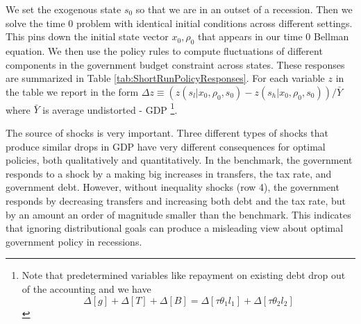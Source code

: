 \documentclass[thmsb,11pt]{article}
\begin{document}
We set the exogenous state
$s_0$ so  that we are in an outset of a recession.  Then we  solve the time 0 problem with identical initial conditions across
different settings. This pins down the initial state vector  $x_0,\rho_0$  that appears in our time $0$ Bellman equation.
We then use the policy rules to compute fluctuations of
different components in the government budget constraint across states. These responses
are summarized in Table \ref{tab:ShortRunPolicyResponses}. For each variable
$z$ in the table we report in the form $\Delta z\equiv \left( z\left(
s_l|x_0,\rho_0,s_0\right) -z\left( s_h|x_0,\rho_0,s_0\right) \right) /\bar{Y}
$ where $\bar{Y}$ is average undistorted - GDP \footnote{%
Note that predetermined variables like repayment on existing debt drop out
of the accounting and we have
\begin{equation*}
\Delta [g]+\Delta[T]+ \Delta [B]=\Delta[\tau \theta_1 l_1]+ \Delta[\tau
\theta_2 l_2]
\end{equation*}%
}.



The source of shocks is very important. Three different types of shocks
that produce similar drops in GDP  have very different consequences for optimal policies, both qualitatively and
quantitatively. %
In the benchmark, the government responds to a shock by a making big increases in transfers, the  tax rate, and  government debt. However, without inequality shocks (row 4), the government
responds by decreasing transfers and  increasing both debt and
the tax rate, but by an amount an order of magnitude smaller than the benchmark. This  indicates that ignoring distributional goals can produce a misleading view about  optimal government
policy in recessions.
\end{document}
